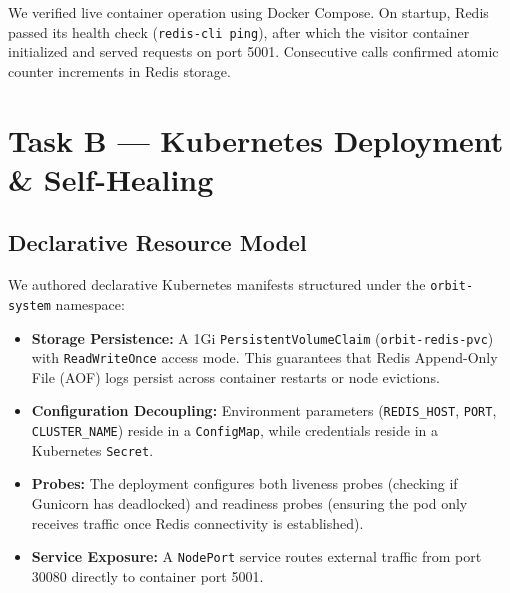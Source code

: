 \documentclass[conference]{IEEEtran}
\begin{document}
\begin{table}[htbp]
\centering
\caption{Docker Image Optimization Comparison}
\label{tab:docker_opt}
\end{table}

We verified live container operation using Docker Compose. On startup, Redis passed its health check (\texttt{redis-cli ping}), after which the visitor container initialized and served requests on port 5001. Consecutive calls confirmed atomic counter increments in Redis storage.

\section{Task B --- Kubernetes Deployment \& Self-Healing}

\subsection{Declarative Resource Model}
We authored declarative Kubernetes manifests structured under the \texttt{orbit-system} namespace:
\begin{itemize}
    \item \textbf{Storage Persistence:} A 1Gi \texttt{PersistentVolumeClaim} (\texttt{orbit-redis-pvc}) with \texttt{ReadWriteOnce} access mode. This guarantees that Redis Append-Only File (AOF) logs persist across container restarts or node evictions.
    \item \textbf{Configuration Decoupling:} Environment parameters (\texttt{REDIS\_HOST}, \texttt{PORT}, \texttt{CLUSTER\_NAME}) reside in a \texttt{ConfigMap}, while credentials reside in a Kubernetes \texttt{Secret}.
    \item \textbf{Probes:} The deployment configures both liveness probes (checking if Gunicorn has deadlocked) and readiness probes (ensuring the pod only receives traffic once Redis connectivity is established).
    \item \textbf{Service Exposure:} A \texttt{NodePort} service routes external traffic from port 30080 directly to container port 5001.
\end{itemize}
\end{document}
